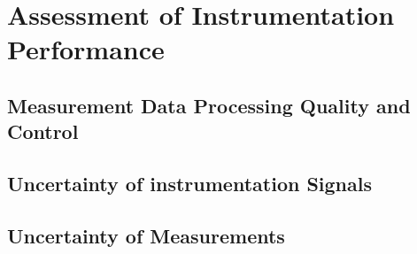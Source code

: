 \chapter{Assessment of Instrumentation Performance {\color{magenta}{Contributing author: COM }}
}
\label{ch:performanceassessment}

\noindent
{}





\section{Measurement Data Processing Quality and Control }\label{sec:dataqa}

\section{Uncertainty of instrumentation Signals }\label{sec:instrumentuncertainty}


\section{Uncertainty of Measurements}\label{sec:measurementuncertainty}



